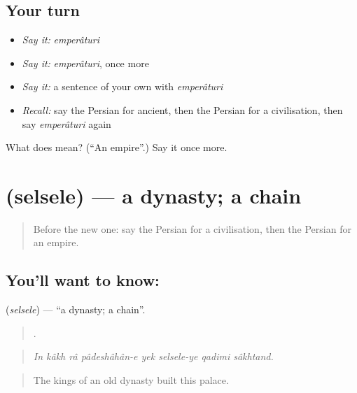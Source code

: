 \subsection*{Your turn}
\begin{itemize}
\raggedright
  \item \emph{Say it:} \emph{emperâturi}
  \item \emph{Say it:} \emph{emperâturi}, once more
  \item \emph{Say it:} a sentence of your own with \emph{emperâturi}
  \item \emph{Recall:} say the Persian for ancient, then the Persian for a civilisation, then say \emph{emperâturi} again
\end{itemize}

\begin{tcolorbox}[breakable,colback=teal!4,colframe=teal!35!black,title={Before you move on}]
What does  mean? (\textquotedblleft{}An empire\textquotedblright{}.) Say it once more.
\end{tcolorbox}
\section[\texorpdfstring{\fa{سلسله} (selsele)}{سلسله (selsele)}]{ (selsele) — a dynasty; a chain}

\label{lesson:FA-C352-selsele}



\begin{quote}
Before the new one: say the Persian for a civilisation, then the Persian for an empire.
\end{quote}

\subsection*{You'll want to know: }
\textbf{} (\emph{selsele}) — \textquotedblleft{}a dynasty; a chain\textquotedblright{}.

\begin{quote}
       .
\end{quote}

\begin{quote}
\emph{In kâkh râ pâdeshâhân-e yek selsele-ye qadimi sâkhtand.}
\end{quote}

\begin{quote}
The kings of an old dynasty built this palace.
\end{quote}

